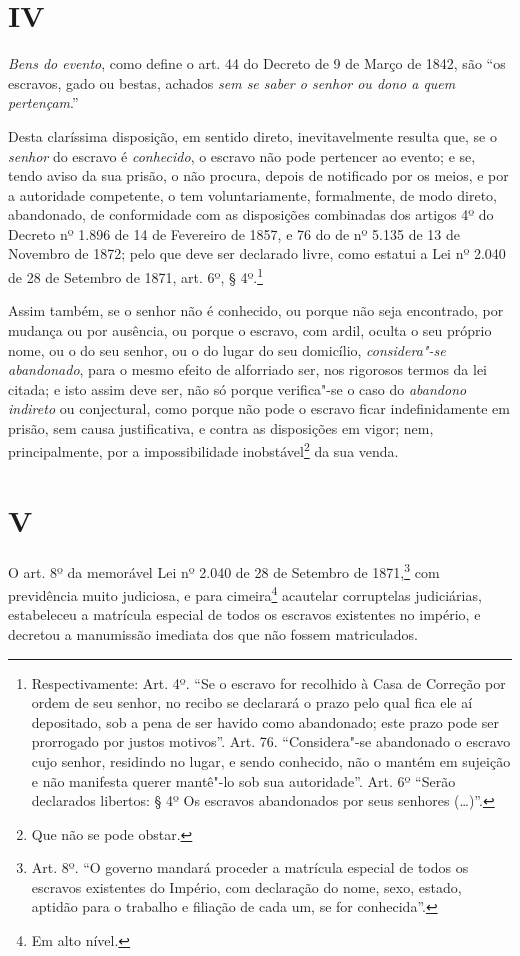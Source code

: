 \section*{IV}

\emph{Bens do evento}, como define o art. 44 do Decreto de 9 de Março de
1842, são ``os escravos, gado ou bestas, achados \emph{sem se saber o
senhor ou dono a quem pertençam}.''

Desta claríssima disposição, em sentido direto, inevitavelmente resulta
que, se o \emph{senhor} do escravo é \emph{conhecido}, o escravo não
pode pertencer ao evento; e se, tendo aviso da sua prisão, o não
procura, depois de notificado por os meios, e por a autoridade
competente, o tem voluntariamente, formalmente, de modo direto,
abandonado, de conformidade com as disposições combinadas dos artigos 4º
do Decreto nº 1.896 de 14 de Fevereiro de 1857, e 76 do de nº 5.135 de
13 de Novembro de 1872; pelo que deve ser declarado livre, como estatui
a Lei nº 2.040 de 28 de Setembro de 1871, art. 6º, § 4º.\footnote{
  Respectivamente: Art. 4º. ``Se o escravo for recolhido à Casa de
  Correção por ordem de seu senhor, no recibo se declarará o prazo pelo
  qual fica ele aí depositado, sob a pena de ser havido como abandonado;
  este prazo pode ser prorrogado por justos motivos''. Art. 76.
  ``Considera"-se abandonado o escravo cujo senhor, residindo no lugar, e
  sendo conhecido, não o mantém em sujeição e não manifesta querer
  mantê"-lo sob sua autoridade''. Art. 6º ``Serão declarados libertos: § 4º
  Os escravos abandonados por seus senhores (\ldots{})''.}

Assim também, se o senhor não é conhecido, ou porque não seja
encontrado, por mudança ou por ausência, ou porque o escravo, com ardil,
oculta o seu próprio nome, ou o do seu senhor, ou o do lugar do seu
domicílio, \emph{considera"-se abandonado}, para o mesmo efeito de
alforriado ser, nos rigorosos termos da lei citada; e isto assim deve
ser, não só porque verifica"-se o caso do \emph{abandono indireto} ou
conjectural, como porque não pode o escravo ficar indefinidamente em
prisão, sem causa justificativa, e contra as disposições em vigor; nem,
principalmente, por a impossibilidade inobstável\footnote{Que não se
  pode obstar.} da sua venda.

\section*{V}

O art. 8º da memorável Lei nº 2.040 de 28 de Setembro de 1871,\footnote{
  Art. 8º. ``O governo mandará proceder a matrícula especial de todos os
  escravos existentes do Império, com declaração do nome, sexo, estado,
  aptidão para o trabalho e filiação de cada um, se for conhecida''.} com
previdência muito judiciosa, e para cimeira\footnote{Em alto nível.}
acautelar corruptelas judiciárias, estabeleceu a matrícula especial de
todos os escravos existentes no império, e decretou a manumissão
imediata dos que não fossem matriculados.

